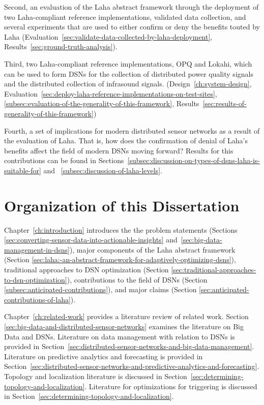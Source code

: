 Second, an evaluation of the Laha abstract framework through the deployment of two Laha-compliant reference implementations, validated data collection, and several experiments that are used to either confirm or deny the benefits touted by Laha (Evaluation~\ref{sec:validate-data-collected-by-laha-deployment}, Results~\ref{sec:ground-truth-analysis}).

Third, two Laha-compliant reference implementations, OPQ and Lokahi, which can be used to form DSNs for the collection of distributed power quality signals and the distributed collection of infrasound signals. (Design~\ref{ch:system-design}, Evaluation~\ref{sec:deploy-laha-reference-implementations-on-test-sites}, \ref{subsec:evaluation-of-the-generality-of-this-framework}, Results~\ref{sec:results-of-generality-of-this-framework})

Fourth, a set of implications for modern distributed sensor networks as a result of the evaluation of Laha. That is, how does the confirmation of denial of Laha's benefits affect the field of modern DSNs moving forward? Results for this contributions can be found in Sections~\ref{subsec:discussion-on-types-of-dsns-laha-is-suitable-for} and ~\ref{subsec:discussion-of-laha-levels}.

\section{Organization of this Dissertation}\label{subsec:organization-of-this-dissertation}

Chapter~\ref{ch:introduction} introduces the the problem statements (Sections \ref{sec:converting-sensor-data-into-actionable-insights} and~\ref{sec:big-data-management-in-dsns}), major components of the Laha abstract framework (Section \ref{sec:laha:-an-abstract-framework-for-adaptively-optimizing-dsns}), traditional approaches to DSN optimization (Section \ref{sec:traditional-approaches-to-dsn-optimization}), contributions to the field of DSNs (Section \ref{subsec:anticipated-contributions}), and major claims (Section \ref{sec:anticipated-contributions-of-laha}).

Chapter~\ref{ch:related-work} provides a literature review of related work. Section \ref{sec:big-data-and-distributed-sensor-networks} examines the literature on Big Data and DSNs. Literature on data management with relation to DSNs is provided in Section~\ref{sec:distributed-sensor-networks-and-big-data-management}. Literature on predictive analytics and forecasting is provided in Section~\ref{sec:distributed-sensor-networks-and-predictive-analytics-and-forecasting}. Topology and localization literature is discussed in Section~\ref{sec:determining-topology-and-localization}. Literature for optimizations for triggering is discussed in Section~\ref{sec:determining-topology-and-localization}.

